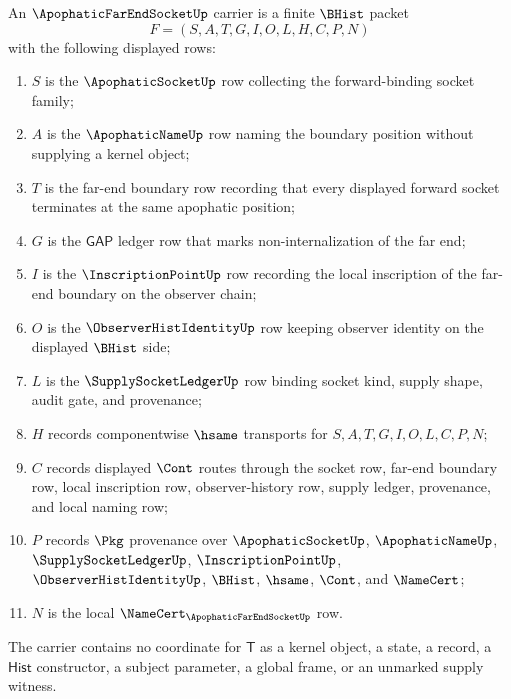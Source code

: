 \begin{definition}
\label{def:apophatic-far-end-socket-carrier}
An $\ApophaticFarEndSocketUp$ carrier is a finite $\BHist$ packet
$$
F=(S,A,T,G,I,O,L,H,C,P,N)
$$
with the following displayed rows:
\begin{enumerate}
\item $S$ is the $\ApophaticSocketUp$ row collecting the forward-binding socket family;
\item $A$ is the $\ApophaticNameUp$ row naming the boundary position without supplying a kernel object;
\item $T$ is the far-end boundary row recording that every displayed forward socket terminates at the same apophatic position;
\item $G$ is the $\mathsf{GAP}$ ledger row that marks non-internalization of the far end;
\item $I$ is the $\InscriptionPointUp$ row recording the local inscription of the far-end boundary on the observer chain;
\item $O$ is the $\ObserverHistIdentityUp$ row keeping observer identity on the displayed $\BHist$ side;
\item $L$ is the $\SupplySocketLedgerUp$ row binding socket kind, supply shape, audit gate, and provenance;
\item $H$ records componentwise $\hsame$ transports for $S,A,T,G,I,O,L,C,P,N$;
\item $C$ records displayed $\Cont$ routes through the socket row, far-end boundary row, local inscription row, observer-history row, supply ledger, provenance, and local naming row;
\item $P$ records $\Pkg$ provenance over $\ApophaticSocketUp$, $\ApophaticNameUp$, $\SupplySocketLedgerUp$, $\InscriptionPointUp$, $\ObserverHistIdentityUp$, $\BHist$, $\hsame$, $\Cont$, and $\NameCert$;
\item $N$ is the local $\NameCert_{\ApophaticFarEndSocketUp}$ row.
\end{enumerate}
The carrier contains no coordinate for $\mathsf{T}$ as a kernel object, a state, a record, a $\mathsf{Hist}$ constructor, a subject parameter, a global frame, or an unmarked supply witness.
\end{definition}

